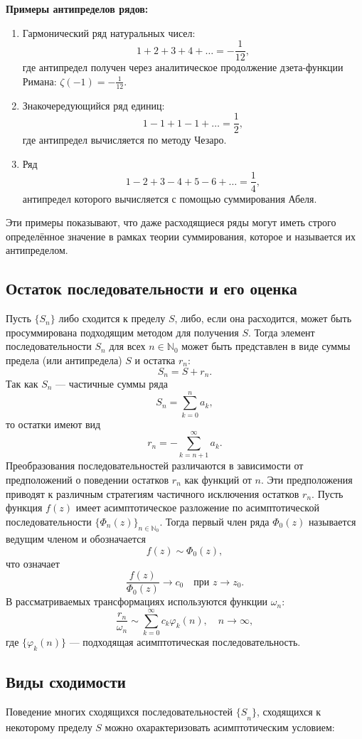 \documentclass[14pt, a4paper]{extarticle}
\theoremstyle{definition}
\theoremstyle{remark}
\begin{document}
\textbf{Примеры антипределов рядов:}
\begin{enumerate}
  \item Гармонический ряд натуральных чисел:
  \[
  1 + 2 + 3 + 4 + \dots = -\frac{1}{12},
  \]
  где антипредел получен через аналитическое продолжение дзета-функции Римана:  
  \(\zeta(-1) = -\frac{1}{12}\).

  \item Знакочередующийся ряд единиц:
  \[
  1 - 1 + 1 - 1 + \dots = \frac{1}{2},
  \]
  где антипредел вычисляется по методу Чезаро.

  \item Ряд
  \[
  1 - 2 + 3 - 4 + 5 - 6 + \dots = \frac{1}{4},
  \]
  антипредел которого вычисляется с помощью суммирования Абеля.
\end{enumerate}

Эти примеры показывают, что даже расходящиеся ряды могут иметь строго определённое значение в рамках теории суммирования, которое и называется их антипределом.



\subsection*{Остаток последовательности и его оценка}
Пусть \(\{S_n\}\) либо сходится к пределу \(S\), либо, если она расходится, может быть просуммирована подходящим методом для получения \(S\).
Тогда элемент последовательности \(S_n\) для всех \(n \in \mathbb{N}_0\) может быть представлен в виде суммы предела (или антипредела) \(S\) и остатка \(r_n\):
\[
S_n = S + r_n.
\]
Так как \(S_n\) — частичные суммы ряда
\[
S_n = \sum_{k=0}^{n} a_k,
\]
то остатки имеют вид
\[
r_n = - \sum_{k=n+1}^{\infty} a_k.
\]
Преобразования последовательностей различаются в зависимости от предположений о поведении остатков \(r_n\) как функций от \(n\). Эти предположения приводят к различным стратегиям частичного исключения остатков \(r_n\).
Пусть функция \(f(z)\) имеет асимптотическое разложение по асимптотической последовательности \(\{\Phi_n(z)\}_{n\in\mathbb{N}_0}\). Тогда первый член ряда \(\Phi_0(z)\) называется ведущим членом и обозначается
\[
f(z) \sim \Phi_0(z),
\]
что означает
\[
\frac{f(z)}{\Phi_0(z)} \to c_0 \quad \text{при } z \to z_0.
\]
В рассматриваемых трансформациях используются функции \(\omega_n\):
\[
\frac{r_n}{\omega_n} \sim \sum_{k=0}^{\infty} c_k \varphi_k(n), \quad n \to \infty,
\]
где \(\{\varphi_k(n)\}\) — подходящая асимптотическая последовательность.


\subsection*{Виды сходимости}
Поведение многих сходящихся последовательностей \({\{ S}_{n}\}\),
сходящихся к некоторому пределу \(S\) можно охарактеризовать
асимптотическим условием:
\end{document}
